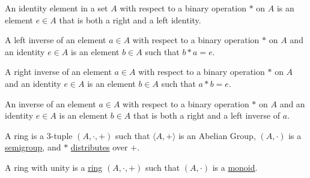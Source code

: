             \begin{definition}
                \label{%
                    Definition:MathEnc:Analysis:%
                    Sum:IdentityElement%
                }
                An identity element in a set $A$ with
                respect to a binary operation $*$
                on $A$ is an element $e\in A$ that is
                both a right and a left identity.
            \end{definition}
            \begin{definition}
                \label{Definition:MathEnc:Analysis:Sum:LeftInverse}
                A left inverse of an element $a\in A$ with
                respect to a binary operation $*$
                on $A$ and an identity $e\in A$ is an element
                $b\in A$ such that $b*a=e$.
            \end{definition}
            \begin{definition}
                \label{Definition:MathEnc:Analysis:Sum:RightInverse}
                A right inverse of an element $a\in A$ with
                respect to a binary operation $*$
                on $A$ and an identity $e\in A$ is an element
                $b\in A$ such that $a*b=e$.
            \end{definition}
            \begin{definition}
                \label{Definition:MathEnc:Analysis:Sum:Inverse}
                An inverse of an element $a\in A$ with respect to a
                binary operation $*$ on $A$ and an identity
                $e\in A$ is an element $b\in A$ that is both a
                right and a left inverse of $a$.
            \end{definition}
            \begin{definition}
                \label{Definition:MathEnc:Analysis:Sum:Ring}
                A ring is a 3-tuple $(A,\cdot,+)$ such that
                $\langle A,+\rangle$ is an Abelian Group, $(A,\cdot)$ is a
                \hyperref[Definition:MathEnc:Analysis:Sum:Semigroup]{semigroup},
                and $*$
                \hyperref[Definition:MathEnc:Analysis:%
                    Sum:Distribute]{distributes}
                over $+$.
            \end{definition}
            \begin{definition}
                \label{Definition:MathEnc:Analysis:Sum:RingUnit}
                A ring with unity is a
                \hyperref[Definition:MathEnc:Analysis:Sum:Ring]{ring}
                $(A,\cdot,+)$ such that $(A,\cdot)$ is a
                \hyperref[%
                    Definition:MathEnc:%
                    Analysis:Sum:Monoid%
                ]{monoid}.
            \end{definition}
